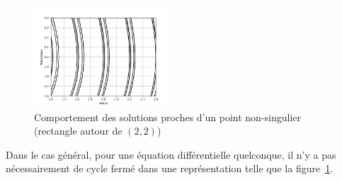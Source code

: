 \begin{figure}[htbp!]
	\centering
	\includegraphics[width=0.45\textwidth]{res/behaviour}
	\caption{Comportement des solutions proches d'un point non-singulier (rectangle autour de $(2, 2)$)}
	\label{fig:behaviour}
\end{figure}

Dans le cas général, pour une équation différentielle quelconque, il n'y a pas nécessairement de cycle fermé dans une représentation
telle que la figure~\ref{fig:behaviour}.
